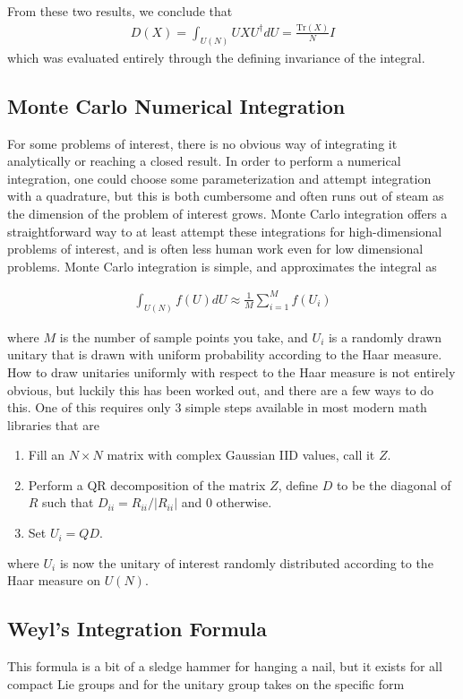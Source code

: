 \documentclass[11pt, oneside]{article}   	%
\begin{document}
From these two results, we conclude that
\begin{align*} 
D(X) = \int_{U(N)} UXU^\dagger dU = \frac{\text{Tr}(X)}{N} I 
\end{align*}
which was evaluated entirely through the defining invariance of the integral.

\subsection{Monte Carlo Numerical Integration}
For some problems of interest, there is no obvious way of integrating it analytically or reaching a closed result.  
In order to perform a numerical integration, one could choose some parameterization and attempt integration with a quadrature, but this is both cumbersome and often runs out of steam as the dimension of the problem of interest grows.  
Monte Carlo integration offers a straightforward way to at least attempt these integrations for high-dimensional problems of interest, and is often less human work even for low dimensional problems.  
Monte Carlo integration is simple, and approximates the integral as

\begin{align*} 
\int_{U(N)} f(U) dU \approx\frac{1}{M}\sum_{i=1}^M f(U_i) 
\end{align*}

where $M$ is the number of sample points you take, and $U_i$ is a randomly drawn unitary that is drawn with uniform probability according to the Haar measure.  
How to draw unitaries uniformly with respect to the Haar measure is not entirely obvious, but luckily this has been worked out, and there are a few ways to do this.  
One of this requires only 3 simple steps available in most modern math libraries that are

\begin{enumerate}
\item
Fill an $N \times N$ matrix with complex Gaussian IID values, call it $Z$.
\item
Perform a QR decomposition of the matrix $Z$, define $D$ to be the diagonal of $R$ such that $D_{ii} = R_{ii} / |R_{ii}|$ and 0 otherwise.
\item
Set $U_i = Q D$.
\end{enumerate}
where $U_i$ is now the unitary of interest randomly distributed according to the Haar measure on $U(N)$.  

\subsection{Weyl’s Integration Formula}
This formula is a bit of a sledge hammer for hanging a nail, but it exists for all compact Lie groups and for the unitary group takes on the specific form
\end{document}
